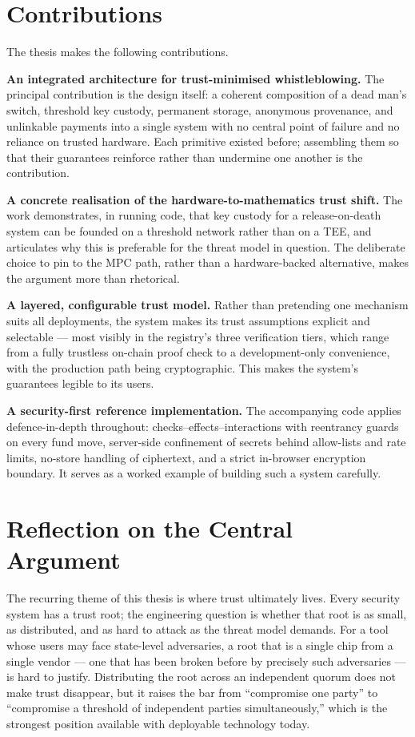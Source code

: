 \section{Contributions}
\label{sec:concl-contributions}

The thesis makes the following contributions.

\textbf{An integrated architecture for trust-minimised whistleblowing.} The
principal contribution is the design itself: a coherent composition of a dead
man's switch, threshold key custody, permanent storage, anonymous provenance, and
unlinkable payments into a single system with no central point of failure and no
reliance on trusted hardware. Each primitive existed before; assembling them so
that their guarantees reinforce rather than undermine one another is the
contribution.

\textbf{A concrete realisation of the hardware-to-mathematics trust shift.} The
work demonstrates, in running code, that key custody for a release-on-death system
can be founded on a threshold network rather than on a TEE, and articulates why
this is preferable for the threat model in question. The deliberate choice to pin
to the MPC path, rather than a hardware-backed alternative, makes the argument more
than rhetorical.

\textbf{A layered, configurable trust model.} Rather than pretending one mechanism
suits all deployments, the system makes its trust assumptions explicit and
selectable --- most visibly in the registry's three verification tiers, which range
from a fully trustless on-chain proof check to a development-only convenience, with
the production path being cryptographic. This makes the system's guarantees legible
to its users.

\textbf{A security-first reference implementation.} The accompanying code applies
defence-in-depth throughout: checks--effects--interactions with reentrancy guards
on every fund move, server-side confinement of secrets behind allow-lists and rate
limits, no-store handling of ciphertext, and a strict in-browser encryption
boundary. It serves as a worked example of building such a system carefully.

\section{Reflection on the Central Argument}
\label{sec:concl-reflection}

The recurring theme of this thesis is where trust ultimately lives. Every security
system has a trust root; the engineering question is whether that root is as small,
as distributed, and as hard to attack as the threat model demands. For a tool whose
users may face state-level adversaries, a root that is a single chip from a single
vendor --- one that has been broken before by precisely such adversaries --- is hard to
justify. Distributing the root across an independent quorum does not make trust
disappear, but it raises the bar from ``compromise one party'' to ``compromise a
threshold of independent parties simultaneously,'' which is the strongest position
available with deployable technology today.

